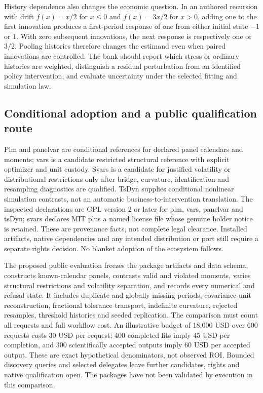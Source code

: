 History dependence also changes the economic question. In an authored recursion with drift $f(x)=x/2$ for $x\leq0$ and $f(x)=3x/2$ for $x>0$, adding one to the first innovation produces a first-period response of one from either initial state $-1$ or $1$. With zero subsequent innovations, the next response is respectively one or $3/2$. Pooling histories therefore changes the estimand even when paired innovations are controlled. The bank should report which stress or ordinary histories are weighted, distinguish a residual perturbation from an identified policy intervention, and evaluate uncertainty under the selected fitting and simulation law.\citep{exec25_rdyn_choice}

\subsection{Conditional adoption and a public qualification route}

Plm and panelvar are conditional references for declared panel calendars and moments; vars is a candidate restricted structural reference with explicit optimizer and unit custody. Svars is a candidate for justified volatility or distributional restrictions only after bridge, curvature, identification and resampling diagnostics are qualified. TsDyn supplies conditional nonlinear simulation contrasts, not an automatic business-to-intervention translation. The inspected declarations are GPL version 2 or later for plm, vars, panelvar and tsDyn; svars declares MIT plus a named license file whose genuine holder notice is retained. These are provenance facts, not complete legal clearance. Installed artifacts, native dependencies and any intended distribution or port still require a separate rights decision. No blanket adoption of the ecosystem follows.\citep{exec25_rdyn_plm,exec25_rdyn_vars,exec25_rdyn_svars,exec25_rdyn_panelvar,exec25_rdyn_tsdyn}

The proposed public evaluation freezes the package artifacts and data schema, constructs known-calendar panels, contrasts valid and violated moments, varies structural restrictions and volatility separation, and records every numerical and refusal state. It includes duplicate and globally missing periods, covariance-unit reconstruction, fractional tolerance transport, indefinite curvature, rejected resamples, threshold histories and seeded replication. The comparison must count all requests and full workflow cost. An illustrative budget of 18,000 USD over 600 requests costs 30 USD per request; 400 completed fits imply 45 USD per completion, and 300 scientifically accepted outputs imply 60 USD per accepted output. These are exact hypothetical denominators, not observed ROI. Bounded discovery queries and selected delegates leave further candidates, rights and native qualification open. The packages have not been validated by execution in this comparison.\citep{exec25_rdyn_choice}
